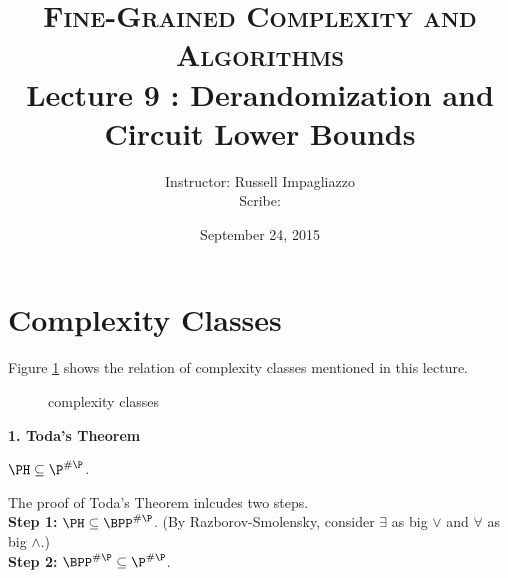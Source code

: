\documentclass[letterpaper, 12pt]{article}
\begin{document}
 	
 
 
\title{\vspace{-50pt} \textsc{\large Fine-Grained Complexity and Algorithms}\\ \vspace{25pt} {\Large \textbf{Lecture 9 : Derandomization and Circuit Lower Bounds}}}
\author{{\normalsize Instructor: Russell Impagliazzo}\\{\normalsize Scribe: \myname}}
\date{{\normalsize September 24, 2015}}
\maketitle 
 
\section{Complexity Classes}
 
 Figure \ref{fig1} shows the relation of complexity classes mentioned in this lecture.
 
\begin{figure}[h] \label{fig1}
\centering
	\caption{complexity classes}
\end{figure}

\noindent \textbf{1. Toda's Theorem}

\begin{theorem}[Toda]
	$\PH \subseteq \P^{\#\P}$.
\end{theorem}
The proof of Toda's Theorem inlcudes two steps. \\
\indent \textbf{Step 1:} $\PH \subseteq \BPP^{\#\P}$.
(By Razborov-Smolensky, consider $\exists$ as big $\vee$ and $\forall$ as big $\wedge$.)\\
\indent \textbf{Step 2:} $\BPP^{\#\P} \subseteq \P^{\#\P}$.
\end{document}
